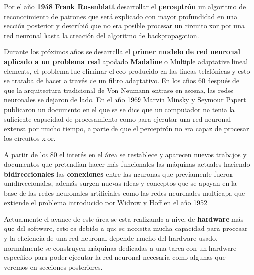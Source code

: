 \documentclass[a4paper, 11pt]{article} %
\begin{document}
Por el año \textbf{1958} \textbf{Frank Rosenblatt} desarrollar el \textbf{perceptrón} un algoritmo de reconocimiento de patrones que será explicado con mayor profundidad en una sección posterior y describió que no era posible procesar un circuito xor por una red neuronal hasta la creación del algoritmo de backpropagation.

Durante los próximos años se desarrolla el \textbf{primer modelo de red neuronal aplicado a un problema real} apodado \textbf{Madaline} o Multiple adaptative lineal elements, el problema fue eliminar el eco producido en las lineas telefónicas y esto se trataba de hacer a través de un filtro adaptativo. En los años 60 después de que la arquitectura tradicional de Von Neumann entrase en escena, las redes neuronales se dejaron de lado. En el año 1969 Marvin Minsky y Seymour Papert publicaron un documento en el que se se dice que un computador no tenia la suficiente capacidad de procesamiento como para ejecutar una red neuronal extensa por mucho tiempo, a parte de que el perceptrón no era capaz de procesar los circuitos x-or.

A partir de los 80 el interés en el área se restablece y aparecen nuevos trabajos y documentos que pretendían hacer más funcionales las máquinas actuales haciendo \textbf{bidireccionales} las \textbf{conexiones} entre las neuronas que previamente fueron unidireccionales, además surgen nuevas ideas y conceptos que se apoyan en la base de las redes neuronales artificiales como las redes neuronales multicapa que extiende el problema introducido por Widrow y Hoff en el año 1952.

Actualmente el avance de este área se esta realizando a nivel de \textbf{hardware} más que del software, esto es debido a que se necesita mucha capacidad para procesar y la eficiencia de una red neuronal depende mucho del hardware usado, normalmente se construyen máquinas dedicadas a una tarea con un hardware específico para poder ejecutar la red neuronal necesaria como algunas que veremos en secciones posteriores.
\end{document}
